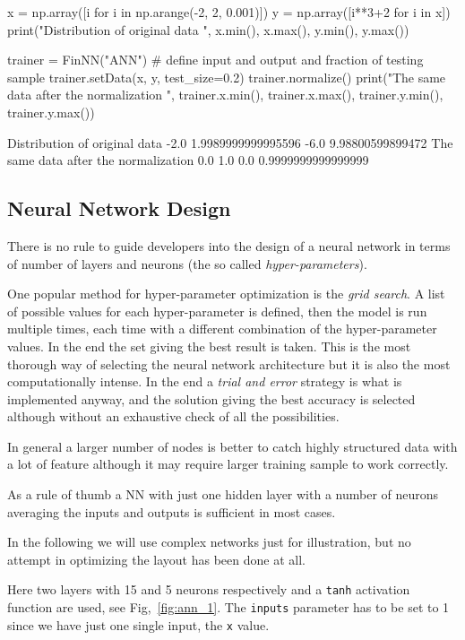 \begin{ipython}
x = np.array([i for i in np.arange(-2, 2, 0.001)])
y = np.array([i**3+2 for i in x])
print("Distribution of original data ", x.min(), x.max(), y.min(), y.max())

trainer = FinNN("ANN")
# define input and output and fraction of testing sample
trainer.setData(x, y, test_size=0.2)
trainer.normalize()
print("The same data after the normalization ", trainer.x.min(),
       trainer.x.max(), trainer.y.min(), trainer.y.max())
\end{ipython}
\begin{ioutput}
Distribution of original data  -2.0 1.9989999999995596 -6.0 9.98800599899472
The same data after the normalization  0.0 1.0 0.0 0.9999999999999999
\end{ioutput}

\subsection{Neural Network Design}
\label{neural-network-design}

There is no rule to guide developers into the design of a neural network in terms of number of layers and neurons (the so called \emph{hyper-parameters}). 

One popular method for hyper-parameter optimization is the \emph{grid search}. 
A list of possible values for each hyper-parameter is defined, then the model is run multiple times, each time with a different combination of the hyper-parameter values. In the end the set giving the best result is taken. This is the most thorough way of selecting the neural network architecture but it is also the most computationally intense.
In the end a \emph{trial and error} strategy is what is implemented anyway, and the solution giving the best accuracy is selected although without an exhaustive check of all the possibilities.

In general a larger number of nodes is better to catch highly structured data with a lot of feature although it may require larger training sample to work correctly.

As a rule of thumb a NN with just one hidden layer with a number of neurons averaging the inputs and outputs is sufficient in most cases.

In the following we will use complex networks just for illustration, but no attempt in optimizing the layout has been done at all.

Here two layers with 15 and 5 neurons respectively and a \texttt{tanh} activation function are used, see Fig,~\ref{fig:ann_1}. The \texttt{inputs} parameter has to be set to 1 since we have just one single input, the \texttt{x} value.

